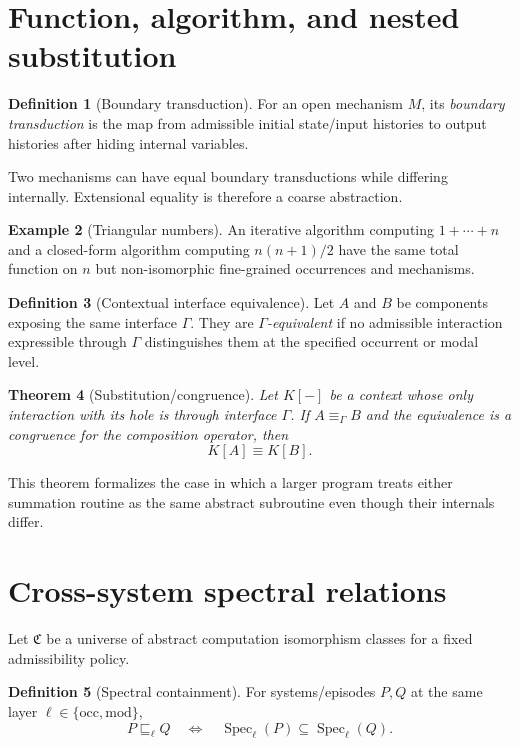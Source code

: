 \documentclass[11pt,a4paper]{article}
\theoremstyle{clean}
\newtheorem{theorem}{Theorem}[section]
\theoremstyle{definition}
\newtheorem{definition}[theorem]{Definition}
\newtheorem{example}[theorem]{Example}
\newcommand{\Spec}{\operatorname{Spec}}
\newcommand{\Occ}{\mathrm{occ}}
\newcommand{\Mod}{\mathrm{mod}}
\begin{document}
\section{Function, algorithm, and nested substitution}

\begin{definition}[Boundary transduction]
For an open mechanism $M$, its \emph{boundary transduction} is the map from admissible initial state/input histories to output histories after hiding internal variables.
\end{definition}

Two mechanisms can have equal boundary transductions while differing internally. Extensional equality is therefore a coarse abstraction.

\begin{example}[Triangular numbers]
An iterative algorithm computing $1+\cdots+n$ and a closed-form algorithm computing $n(n+1)/2$ have the same total function on $n$ but non-isomorphic fine-grained occurrences and mechanisms.
\end{example}

\begin{definition}[Contextual interface equivalence]
Let $A$ and $B$ be components exposing the same interface $\Gamma$. They are \emph{$\Gamma$-equivalent} if no admissible interaction expressible through $\Gamma$ distinguishes them at the specified occurrent or modal level.
\end{definition}

\begin{theorem}[Substitution/congruence]
Let $K[-]$ be a context whose only interaction with its hole is through interface $\Gamma$. If $A\equiv_\Gamma B$ and the equivalence is a congruence for the composition operator, then
\[
K[A]\equiv K[B].
\]
\end{theorem}

This theorem formalizes the case in which a larger program treats either summation routine as the same abstract subroutine even though their internals differ.

\section{Cross-system spectral relations}

Let $\mathfrak C$ be a universe of abstract computation isomorphism classes for a fixed admissibility policy.

\begin{definition}[Spectral containment]
For systems/episodes $P,Q$ at the same layer $\ell\in\{\Occ,\Mod\}$,
\[
P\sqsubseteq_\ell Q
\quad\Longleftrightarrow\quad
\Spec_\ell(P)\subseteq\Spec_\ell(Q).
\]
\end{definition}
\end{document}
